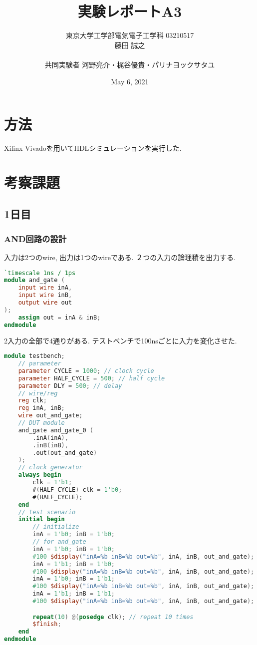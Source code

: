 \documentclass[titlepage]{ltjsarticle}
\title{実験レポートA3}
\author{東京大学工学部電気電子工学科 03210517\\藤田 誠之\\~\\ 共同実験者  河野亮介・梶谷優貴・パリナヨックサタユ}
\date{May 6, 2021}
\begin{document}
\maketitle
\newpage

\section{方法}
Xilinx Vivadoを用いてHDLシミュレーションを実行した.
\section{考察課題}
\subsection{1日目}
\subsubsection{AND回路の設計}

入力は2つのwire, 出力は1つのwireである. ２つの入力の論理積を出力する. 
\begin{lstlisting}[caption=AND回路デザイン,language=verilog]
`timescale 1ns / 1ps
module and_gate (
    input wire inA,
    input wire inB,
    output wire out
);
    assign out = inA & inB;
endmodule
\end{lstlisting}
2入力の全部で4通りがある. テストベンチで100nsごとに入力を変化させた. 
\begin{lstlisting}[caption=AND回路テストベンチ,language=verilog]
    module testbench;
    // parameter
    parameter CYCLE = 1000; // clock cycle
    parameter HALF_CYCLE = 500; // half cycle
    parameter DLY = 500; // delay
    // wire/reg
    reg clk;
    reg inA, inB;
    wire out_and_gate;
    // DUT module
    and_gate and_gate_0 (
        .inA(inA),
        .inB(inB),
        .out(out_and_gate)
    );
    // clock generator
    always begin
        clk = 1'b1;
        #(HALF_CYCLE) clk = 1'b0;
        #(HALF_CYCLE);
    end
    // test scenario
    initial begin
        // initialize
        inA = 1'b0; inB = 1'b0; 
        // for and_gate
        inA = 1'b0; inB = 1'b0;
        #100 $display("inA=%b inB=%b out=%b", inA, inB, out_and_gate);
        inA = 1'b1; inB = 1'b0;
        #100 $display("inA=%b inB=%b out=%b", inA, inB, out_and_gate);  
        inA = 1'b0; inB = 1'b1;
        #100 $display("inA=%b inB=%b out=%b", inA, inB, out_and_gate);  
        inA = 1'b1; inB = 1'b1;
        #100 $display("inA=%b inB=%b out=%b", inA, inB, out_and_gate);

        repeat(10) @(posedge clk); // repeat 10 times
        $finish;
    end
endmodule
\end{lstlisting}
\end{document}
